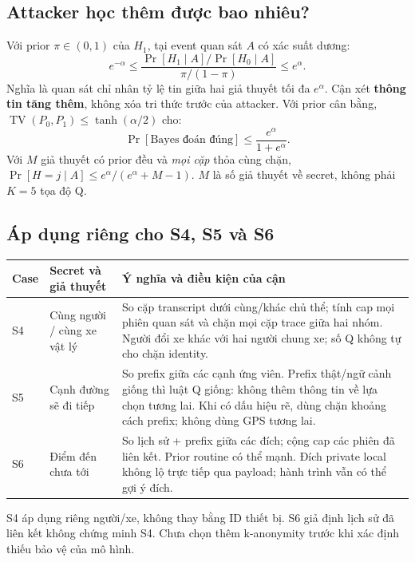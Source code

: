 \documentclass[10pt,a4paper]{article}
\begin{document}
\subsection{Attacker học thêm được bao nhiêu?}
Với prior $\pi\in(0,1)$ của $H_1$, tại event quan sát $A$ có xác suất dương:
\[
 e^{-\alpha}\leq
 \frac{\Pr[H_1\mid A]/\Pr[H_0\mid A]}{\pi/(1-\pi)}
 \leq e^\alpha.
\]
Nghĩa là quan sát chỉ nhân tỷ lệ tin giữa hai giả thuyết tối đa $e^\alpha$.
Cận xét \textbf{thông tin tăng thêm}, không xóa tri thức trước của attacker.
Với prior cân bằng, $\operatorname{TV}(P_0,P_1)\leq\tanh(\alpha/2)$ cho:
\[
 \Pr[\text{Bayes đoán đúng}]\leq\frac{e^\alpha}{1+e^\alpha}.
\]
Với $M$ giả thuyết có prior đều và \emph{mọi cặp} thỏa cùng chặn,
$\Pr[H=j\mid A]\leq e^\alpha/(e^\alpha+M-1)$.
$M$ là số giả thuyết về secret, không phải $K=5$ tọa độ Q.

\subsection{Áp dụng riêng cho S4, S5 và S6}
\par\smallskip
\begin{tabularx}{\linewidth}{@{}P{.75cm}P{3.25cm}Y@{}}\toprule
\textbf{Case} & \textbf{Secret và giả thuyết} & \textbf{Ý nghĩa và điều kiện của cận}\\\midrule
S4 & Cùng người / cùng xe vật lý & So cặp transcript dưới cùng/khác chủ thể; tính cap mọi phiên quan sát và chặn mọi cặp trace giữa hai nhóm. Người đổi xe khác với hai người chung xe; số Q không tự cho chặn identity.\\
S5 & Cạnh đường sẽ đi tiếp & So prefix giữa các cạnh ứng viên. Prefix thật/ngữ cảnh giống thì luật Q giống: không thêm thông tin về lựa chọn tương lai. Khi có dấu hiệu rẽ, dùng chặn khoảng cách prefix; không dùng GPS tương lai.\\
S6 & Điểm đến chưa tới & So lịch sử + prefix giữa các đích; cộng cap các phiên đã liên kết. Prior routine có thể mạnh. Đích private local không lộ trực tiếp qua payload; hành trình vẫn có thể gợi ý đích.\\\bottomrule
\end{tabularx}
S4 áp dụng riêng người/xe, không thay bằng ID thiết bị. S6 giả định lịch sử đã liên kết không chứng minh S4.
Chưa chọn thêm k-anonymity trước khi xác định thiếu bảo vệ của mô hình.
\end{document}
